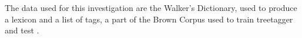 The data used for this investigation are the Walker's Dictionary, used to produce a lexicon and a list of tags, a part of the Brown Corpus used to train treetagger and test . 